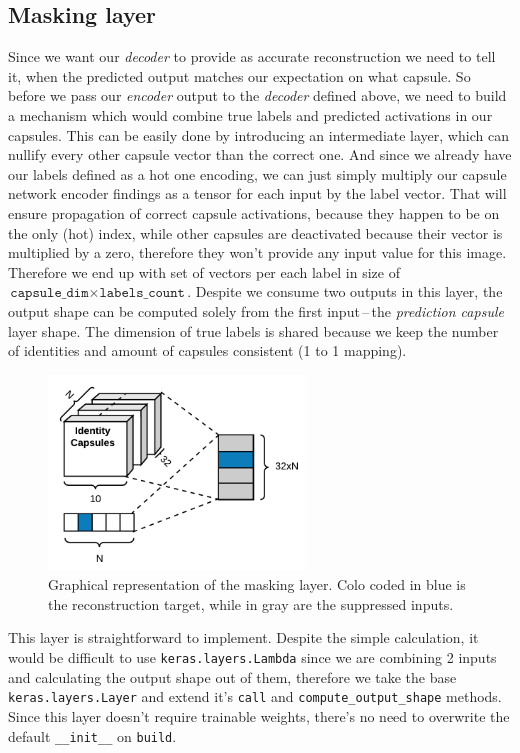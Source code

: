 \subsection{Masking layer}

Since we want our \textit{decoder} to provide as accurate reconstruction we need to tell it, when the predicted output matches our expectation on what capsule. So before we pass our \textit{encoder} output to the \textit{decoder} defined above, we need to build a mechanism which would combine true labels and predicted activations in our capsules. This can be easily done by introducing an intermediate layer, which can nullify every other capsule vector than the correct one. And since we already have our labels defined as a hot one encoding, we can just simply multiply our capsule network encoder findings as a tensor for each input by the label vector. That will ensure propagation of correct capsule activations, because they happen to be on the only (hot) index, while other capsules are deactivated because their vector is multiplied by a zero, therefore they won't provide any input value for this image. Therefore we end up with set of vectors per each label in size of $\texttt{capsule\_dim}\times\texttt{labels\_count}$. Despite we consume two outputs in this layer, the output shape can be computed solely from the first input\,--\,the \textit{prediction capsule} layer shape. The dimension of true labels is shared because we keep the number of identities and amount of capsules consistent (1 to 1 mapping).

\begin{figure}[ht]
    \centering
    \includegraphics[height=14em]{obrazky-figures/my_mask.pdf}
    \caption{Graphical representation of the masking layer. Colo coded in blue is the reconstruction target, while in gray are the suppressed inputs.}
    \label{fig:mask}
\end{figure}

This layer is straightforward to implement. Despite the simple calculation, it would be difficult to use \texttt{keras.layers.Lambda} since we are combining 2 inputs and calculating the output shape out of them, therefore we take the base \texttt{keras.layers.Layer} and extend it's \texttt{call} and \texttt{compute\_output\_shape} methods. Since this layer doesn't require trainable weights, there's no need to overwrite the default \texttt{\_\_init\_\_} on \texttt{build}.

